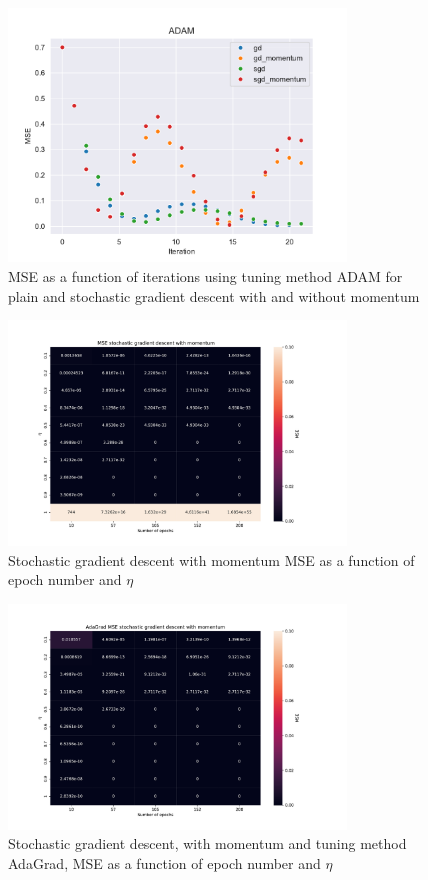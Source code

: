 \begin{figure}[H]
\centering
\includegraphics[width=0.8\textwidth]{Figures/PartA/ADAMMSE(iter).pdf}
\caption{MSE as a function of iterations using tuning method ADAM for plain and stochastic gradient descent with and without momentum}
\label{fig:ADAMMSE-iter-pdf}
\end{figure}



\begin{figure}[H]
\centering
\includegraphics[width=0.8\textwidth]{Figures/PartA/_sgdm_MSE(eta,epochs)}
\caption{Stochastic gradient descent with momentum MSE as a function of epoch number and \(\eta \)	 }
\label{fig:_sgdm_MSE-eta-epochs-}
\end{figure}

\begin{figure}[H]
\centering
\includegraphics[width=0.8\textwidth]{Figures/PartA/AdaGrad_sgdm_MSE(eta,epochs)}
\caption{Stochastic gradient descent, with momentum and tuning method AdaGrad, MSE as a function of epoch number and \(\eta \)	 }
\label{fig:AdaGrad_sgdm_MSE-eta-epochs-}
\end{figure}

